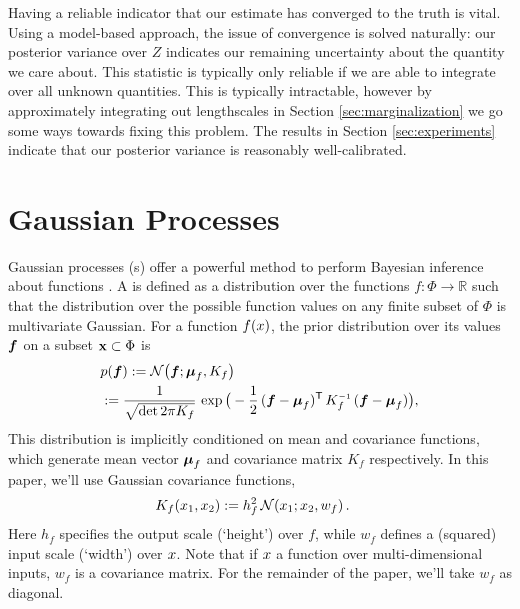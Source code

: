 \documentclass{article}
\begin{document}
Having a reliable indicator that our estimate has converged to the truth is vital.  Using a model-based approach, the issue of convergence is solved naturally:  our posterior variance over $Z$ indicates our remaining uncertainty about the quantity we care about.  This statistic is typically only reliable if we are able to integrate over all unknown quantities.  This is typically intractable, however by approximately integrating out lengthscales in Section \ref{sec:marginalization} we go some ways towards fixing this problem.  The results in Section \ref{sec:experiments} indicate that our posterior variance is reasonably well-calibrated.

\section{Gaussian Processes}
Gaussian processes (\gp s) offer a powerful method to perform Bayesian inference about functions \citep{GPsBook}. A \gpb is defined as a distribution over the functions $f: \Phi \rightarrow \mathbb{R}$ such that the distribution over the possible function values on any finite subset of $\Phi$ is multivariate Gaussian.  For a function $f(\lfv)$, the prior distribution over its values $\vf$ on a subset $\vlfv \subset \Phi$ is
\begin{align*}%
\textstyle
 &\po{\vf}\deq \N{\vf}{\vmu_{f}}{K_{f}}\\
 &\deq\frac{1}{\sqrt{\det{2\pi K_{f}}}}\,\exp \big(-\frac{1}{2}\,(\vf-\vmu_{f})\tra\,K_{f}\inv\,(\vf-\vmu_{f})\big),
\end{align*}
This distribution is implicitly conditioned on mean and covariance functions, which generate mean vector $\vmu_{f}$ and covariance matrix $K_{f}$ respectively. 
In this paper, we'll use Gaussian covariance functions,
\begin{align} \label{eq:Gaussian_cov_fn}
\textstyle
K_{f}(\lfv_1,\lfv_2)& \deq h_f^2\,\N{\lfv_1}{\lfv_2}{w_{f}}.
\end{align} 
Here $h_f$ specifies the output scale (`height') over $f$, while $w_f$ defines a (squared) input scale (`width') over $\lfv$. Note that if $\lfv$ a function over multi-dimensional inputs, $w_f$ is a covariance matrix. For the remainder of the paper, we'll take $w_f$ as diagonal. 
\end{document}
